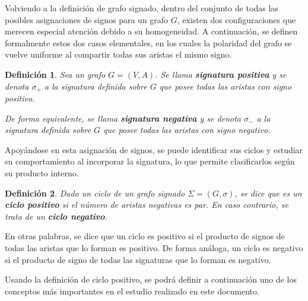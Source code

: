 \documentclass[11pt,a4paper,spanish]{report}
\theoremstyle{plain}
\newtheorem{definicion}{Definición}[chapter]
\begin{document}
Volviendo a la definición de grafo signado, dentro del conjunto de todas las posibles asignaciones de signos para un grafo $G$, existen dos configuraciones que merecen especial atención debido a su homogeneidad. A continuación, se definen formalmente estos dos casos elementales, en los cuales la polaridad del grafo se vuelve uniforme al compartir todas sus aristas el mismo signo.

\begin{definicion}\cite{harary1953notion}
Sea un grafo $G=(V,A)$. Se llama \textbf{signatura positiva} y se denota $\sigma_{+}$ a la signatura definida sobre $G$ que posee todas las aristas con signo positivo.

De forma equivalente, se llama \textbf{signatura negativa} y se denota $\sigma_{-}$ a la signatura definida sobre $G$ que posee todas las aristas con signo negativo. 
\end{definicion}

Apoyándose en esta asignación de signos, se puede identificar sus ciclos y estudiar su comportamiento al incorporar la signatura, lo que permite clasificarlos según su producto interno.
\begin{definicion}\cite{harary1953notion}
Dado un ciclo de un grafo signado $\Sigma=(G,\sigma)$, se dice que es un \textbf{ciclo positivo} si el número  de aristas negativas es par. En caso contrario, se trata de un \textbf{ciclo negativo}.
\end{definicion}

En otras palabras, se dice que un ciclo es positivo si el producto de signos de todas las aristas que lo forman es positivo. De forma análoga, un ciclo es negativo si el producto de signo de todas las signaturas que lo forman es negativo.

Usando la definición de ciclo positivo, se podrá definir a continuación uno de los conceptos más importantes en el estudio realizado en este documento.
\end{document}
